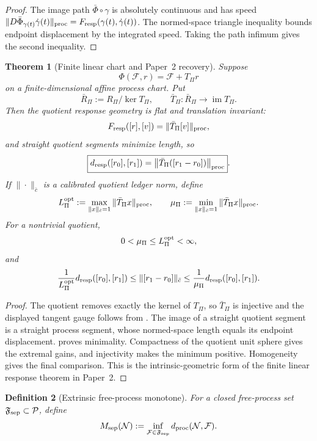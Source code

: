 \documentclass[11pt]{article}
\newtheorem{theorem}{Theorem}[section]
\newtheorem{definition}[theorem]{Definition}
\theoremstyle{remark}
\newcommand{\Pproc}{\mathcal P}
\newcommand{\Fresp}{F_{\rm resp}}
\newcommand{\dresp}{d_{\rm resp}}
\newcommand{\dproc}{d_{\rm proc}}
\begin{document}
\begin{proof}
The image path $\bar\Phi\circ\gamma$ is absolutely continuous and has speed $\|D\bar\Phi_{\gamma(t)}\dot\gamma(t)\|_{\rm proc}=\Fresp(\gamma(t),\dot\gamma(t))$.  The normed-space triangle inequality bounds endpoint displacement by the integrated speed.  Taking the path infimum gives the second inequality.
\end{proof}

\begin{theorem}[Finite linear chart and Paper~2 recovery]
\label{thm:linear-flat-response-geometry}
Suppose
\[
        \Phi(\mathcal F,r)=\mathcal F+T_\Pi r
\]
on a finite-dimensional affine process chart.  Put
\[
        \bar R_\Pi:=R_\Pi/\ker T_\Pi,
        \qquad
        \bar T_\Pi:\bar R_\Pi\to\operatorname{im}T_\Pi.
\]
Then the quotient response geometry is flat and translation invariant:
\[
        \Fresp([r],[v])=\|\bar T_\Pi[v]\|_{\rm proc},
\]
and straight quotient segments minimize length, so
\[
        \boxed{
        \dresp([r_0],[r_1])
        =\left\|\bar T_\Pi([r_1-r_0])\right\|_{\rm proc}
        }.
\]
If $\|\cdot\|_{\bar c}$ is a calibrated quotient ledger norm, define
\[
L_\Pi^{\rm opt}:=\max_{\|x\|_{\bar c}=1}\|\bar T_\Pi x\|_{\rm proc},
\qquad
\mu_\Pi:=\min_{\|x\|_{\bar c}=1}\|\bar T_\Pi x\|_{\rm proc}.
\]
For a nontrivial quotient,
\[
0<\mu_\Pi\le L_\Pi^{\rm opt}<\infty,
\]
and
\[
\frac{1}{L_\Pi^{\rm opt}}\dresp([r_0],[r_1])
\le
\|[r_1-r_0]\|_{\bar c}
\le
\frac{1}{\mu_\Pi}\dresp([r_0],[r_1]).
\]
\end{theorem}

\begin{proof}
The quotient removes exactly the kernel of $T_\Pi$, so $\bar T_\Pi$ is injective and the displayed tangent gauge follows from .  The image of a straight quotient segment is a straight process segment, whose normed-space length equals its endpoint displacement.   proves minimality.  Compactness of the quotient unit sphere gives the extremal gains, and injectivity makes the minimum positive.  Homogeneity gives the final comparison.  This is the intrinsic-geometric form of the finite linear response theorem in Paper~2.
\end{proof}

\begin{definition}[Extrinsic free-process monotone]
For a closed free-process set $\mathfrak F_{\rm sep}\subset\Pproc$, define
\[
        M_{\rm sep}(\mathcal N)
        :=\inf_{\mathcal F\in\mathfrak F_{\rm sep}}
        \dproc(\mathcal N,\mathcal F).
\]
\end{definition}
\end{document}
